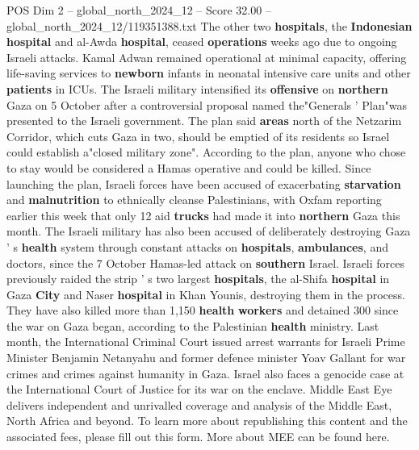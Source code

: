\begin{textsample}{POS Dim 2 – global\_north\_2024\_12 – Score 32.00 – global\_north\_2024\_12/119351388.txt}
The other two \textbf{hospitals}, the \textbf{Indonesian} \textbf{hospital} and al-Awda \textbf{hospital}, ceased \textbf{operations} weeks ago due to ongoing Israeli attacks.
Kamal Adwan remained operational at minimal capacity, offering life-saving services to \textbf{newborn} infants in neonatal intensive care units and other \textbf{patients} in ICUs.
The Israeli military intensified its \textbf{offensive} on \textbf{northern} Gaza on 5 October after a controversial proposal named the"Generals ' Plan"was presented to the Israeli government.
The plan said \textbf{areas} north of the Netzarim Corridor, which cuts Gaza in two, should be emptied of its residents so Israel could establish a"closed military zone".
According to the plan, anyone who chose to stay would be considered a Hamas operative and could be killed.
Since launching the plan, Israeli forces have been accused of exacerbating \textbf{starvation} and \textbf{malnutrition} to ethnically cleanse Palestinians, with Oxfam reporting earlier this week that only 12 aid \textbf{trucks} had made it into \textbf{northern} Gaza this month.
The Israeli military has also been accused of deliberately destroying Gaza ' s \textbf{health} system through constant attacks on \textbf{hospitals}, \textbf{ambulances}, and doctors, since the 7 October Hamas-led attack on \textbf{southern} Israel.
Israeli forces previously raided the strip ' s two largest \textbf{hospitals}, the al-Shifa \textbf{hospital} in Gaza \textbf{City} and Naser \textbf{hospital} in Khan Younis, destroying them in the process.
They have also killed more than 1,150 \textbf{health} \textbf{workers} and detained 300 since the war on Gaza began, according to the Palestinian \textbf{health} ministry.
Last month, the International Criminal Court issued arrest warrants for Israeli Prime Minister Benjamin Netanyahu and former defence minister Yoav Gallant for war crimes and crimes against humanity in Gaza.
Israel also faces a genocide case at the International Court of Justice for its war on the enclave.
Middle East Eye delivers independent and unrivalled coverage and analysis of the Middle East, North Africa and beyond.
To learn more about republishing this content and the associated fees, please fill out this form.
More about MEE can be found here.

\end{textsample}
